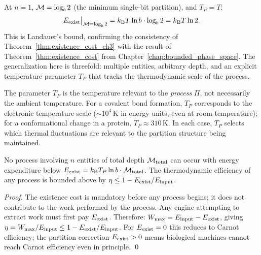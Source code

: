 \begin{remark}
At $n = 1$, $\mathcal{M} = \log_b 2$ (the minimum single-bit partition), and
$T_P = T$:
\begin{equation}
  E_{\mathrm{exist}}\big|_{\mathcal{M} = \log_b 2} = k_{\mathrm{B}} T \ln b \cdot \log_b 2 = k_{\mathrm{B}} T \ln 2.
\end{equation}
This is Landauer's bound, confirming the consistency of
Theorem~\ref{thm:existence_cost_ch3} with the result of
Theorem~\ref{thm:existence_cost} from Chapter~\ref{chap:bounded_phase_space}.
The generalization here is threefold: multiple entities, arbitrary depth, and
an explicit temperature parameter $T_P$ that tracks the thermodynamic scale
of the process.
\end{remark}

\begin{remark}
The parameter $T_P$ is the temperature relevant to the \emph{process}
$\Pi$, not necessarily the ambient temperature. For a covalent bond
formation, $T_P$ corresponds to the electronic temperature scale ($\sim
10^4\,\mathrm{K}$ in energy units, even at room temperature); for a
conformational change in a protein, $T_P \approx 310\,\mathrm{K}$. In
each case, $T_P$ selects which thermal fluctuations are relevant to the
partition structure being maintained.
\end{remark}

\begin{corollary}
\label{cor:min_process_energy}
No process involving $n$ entities of total depth $\mathcal{M}_{\mathrm{total}}$
can occur with energy expenditure below $E_{\mathrm{exist}} = k_{\mathrm{B}} T_P \ln b \cdot \mathcal{M}_{\mathrm{total}}$.
The thermodynamic efficiency of any process is bounded above by
$\eta \leq 1 - E_{\mathrm{exist}} / E_{\mathrm{input}}$.
\end{corollary}

\begin{proof}
The existence cost is mandatory before any process begins; it does not
contribute to the work performed by the process. Any engine attempting to
extract work must first pay $E_{\mathrm{exist}}$. Therefore:
$W_{\mathrm{max}} = E_{\mathrm{input}} - E_{\mathrm{exist}}$,
giving $\eta = W_{\mathrm{max}} / E_{\mathrm{input}} \leq 1 - E_{\mathrm{exist}} / E_{\mathrm{input}}$.
For $E_{\mathrm{exist}} = 0$ this reduces to Carnot efficiency; the partition correction
$E_{\mathrm{exist}} > 0$ means biological machines cannot reach Carnot efficiency even
in principle. \qed
\end{proof}

